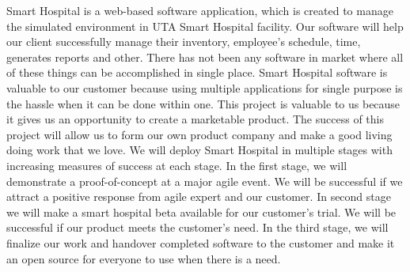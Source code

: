 
Smart Hospital is a web-based software application, which is created to manage the simulated environment in UTA Smart Hospital facility. Our software will help our client successfully manage their inventory, employee's schedule, time, generates reports  and other. There has not been any software in market where all of these things can be accomplished in single place. Smart Hospital software is valuable to our customer because using multiple applications for single purpose is the hassle when it can be done within one. This project is valuable to us because it gives us an opportunity to create a marketable product. The success of this project will allow us to form our own product company and make a good living doing work that we love. We will deploy Smart Hospital in multiple stages with increasing measures of success at each stage. In the first stage, we will demonstrate a proof-of-concept at a major agile event. We will be successful if we attract a positive response from agile expert and our customer. In second stage we will make a smart hospital beta available for our customer’s trial. We will be successful if our product meets the customer’s need. In the third stage, we will finalize our work and handover completed software to the customer and make it an open source for everyone to use when there is a need.